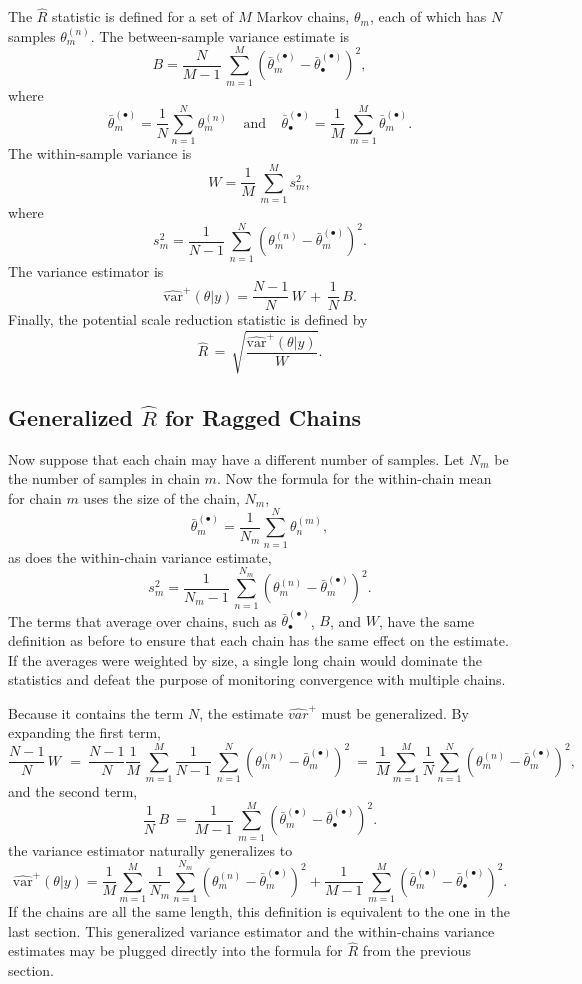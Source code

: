 The $\hat{R}$ statistic is defined for a set of $M$ Markov chains,
$\theta_m$, each of which has $N$ samples $\theta^{(n)}_m$.  The
between-sample variance estimate is
\[
B
= \frac{N}{M-1} \, \sum_{m=1}^M (\bar{\theta}^{(\bullet)}_{m} - \bar{\theta}^{(\bullet)}_{\bullet})^2,
\]
%
where
%
\[
\bar{\theta}_m^{(\bullet)}
= \frac{1}{N} \sum_{n = 1}^N \theta_m^{(n)}
\ \ \ \ \
\mbox{and}
\ \ \ \ \
\bar{\theta}^{(\bullet)}_{\bullet}
= \frac{1}{M} \, \sum_{m=1}^M \bar{\theta}_m^{(\bullet)}.
\]
%
The within-sample variance is
\[
W 
= \frac{1}{M} \, \sum_{m=1}^M s_m^2,
\]
where
\[
s_m^2 = \frac{1}{N-1} \, \sum_{n=1}^N (\theta^{(n)}_m - \bar{\theta}^{(\bullet)}_m)^2.
\]
%
The variance estimator is
\[
\widehat{\mbox{var}}^{+}\!(\theta|y)
= \frac{N-1}{N}\, W \, + \, \frac{1}{N} \, B.
\]
%
Finally, the potential scale reduction statistic is defined by
\[
\hat{R} 
\, = \,
\sqrt{\frac{\widehat{\mbox{var}}^{+}\!(\theta|y)}{W}}.
\]

\subsection{Generalized $\hat{R}$ for Ragged Chains}

Now suppose that each chain may have a different number of samples.
Let $N_m$ be the number of samples in chain $m$.  Now the formula for
the within-chain mean for chain $m$ uses the size of the chain, $N_m$,
\[
\bar{\theta}_m^{(\bullet)}
= \frac{1}{N_m} \sum_{n = 1}^N \theta^{(m)}_n,
\]
as does the within-chain variance estimate,
\[
s_m^2 = \frac{1}{N_m-1} \, \sum_{n=1}^{N_m} (\theta^{(n)}_m - \bar{\theta}^{(\bullet)}_m)^2.
\]
The terms that average over chains, such as
$\bar{\theta}^{(\bullet)}_{\bullet}$, $B$, and $W$, have the same
definition as before to ensure that each chain has the same effect on
the estimate.  If the averages were weighted by size, a single long
chain would dominate the statistics and defeat the purpose of
monitoring convergence with multiple chains.

Because it contains the term $N$, the estimate $\widehat{var}^{+}$
must be generalized.  By expanding the first term,
\[
\frac{N-1}{N}\, W \, 
\ = \ 
\frac{N-1}{N} \frac{1}{M} \, \sum_{m=1}^M
\frac{1}{N-1} \, \sum_{n=1}^N (\theta^{(n)}_m -
\bar{\theta}^{(\bullet)}_m)^2
\ = \
\frac{1}{M} 
\sum_{m=1}^M
\frac{1}{N}
\sum_{n=1}^N (\theta^{(n)}_m -
\bar{\theta}^{(\bullet)}_m)^2,
\]
and the second term,
\[
\frac{1}{N}\, B
\ = \
\frac{1}{M-1} \, \sum_{m=1}^M (\bar{\theta}^{(\bullet)}_{m} - \bar{\theta}^{(\bullet)}_{\bullet})^2.
\]
the variance estimator naturally generalizes to
\[
\widehat{\mbox{var}}^{+}\!(\theta|y)
= 
\frac{1}{M} 
\sum_{m=1}^M
\frac{1}{N_m}
\sum_{n=1}^{N_m} (\theta^{(n)}_m -
\bar{\theta}^{(\bullet)}_m)^2
+
\frac{1}{M-1} \, \sum_{m=1}^M (\bar{\theta}^{(\bullet)}_{m} -
\bar{\theta}^{(\bullet)}_{\bullet})^2.
\]
%
If the chains are all the same length, this definition is equivalent
to the one in the last section.  This generalized variance estimator
and the within-chains variance estimates may be plugged directly into
the formula for $\hat{R}$ from the previous section.


